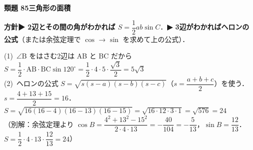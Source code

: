 \documentclass[a4paper,11pt]{ltjsarticle}
\newcommand{\ans}[2]{\Needspace{5\baselineskip}\vspace{6pt}%
  {\sffamily\bfseries 類題 #1\quad #2}\par}
\newcommand{\point}[1]{\textsf{\bfseries ▶ #1}}
\begin{document}
\ans{85}{三角形の面積}
\begin{kai}
\textbf{方針}\quad \point{2辺とその間の角がわかれば $S=\dfrac12ab\sin C$}．\point{3辺がわかればヘロンの公式}（または余弦定理で $\cos$ → $\sin$ を求めて上の公式）．\\[2pt]
\begin{center}
\end{center}
(1)\ $\angle\mathrm B$ をはさむ2辺は AB と BC だから\\
\hspace*{1.5em}$S=\dfrac12\cdot\mathrm{AB}\cdot\mathrm{BC}\sin120^\circ=\dfrac12\cdot4\cdot5\cdot\dfrac{\sqrt3}2=5\sqrt3$\\[2pt]
(2)\ ヘロンの公式 $S=\sqrt{s(s-a)(s-b)(s-c)}$\quad （$s=\dfrac{a+b+c}2$）を使う．\\
\hspace*{1.5em}$s=\dfrac{4+13+15}2=16$．\quad $S=\sqrt{16(16-4)(16-13)(16-15)}=\sqrt{16\cdot12\cdot3\cdot1}=\sqrt{576}=24$\\[2pt]
\hspace*{1.5em}（別解：余弦定理より $\cos B=\dfrac{4^2+13^2-15^2}{2\cdot4\cdot13}=-\dfrac{40}{104}=-\dfrac5{13}$，$\sin B=\dfrac{12}{13}$．\\
\hspace*{1.5em}$S=\dfrac12\cdot4\cdot13\cdot\dfrac{12}{13}=24$）
\end{kai}
\end{document}
